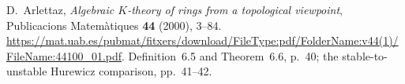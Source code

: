D.~Arlettaz,
\emph{Algebraic $K$-theory of rings from a topological viewpoint},
Publicacions Matem\`atiques \textbf{44} (2000), 3--84.
\url{https://mat.uab.es/pubmat/fitxers/download/FileType:pdf/FolderName:v44(1)/FileName:44100_01.pdf}.
Definition~6.5 and Theorem~6.6, p.~40;
the stable-to-unstable Hurewicz comparison, pp.~41--42.
